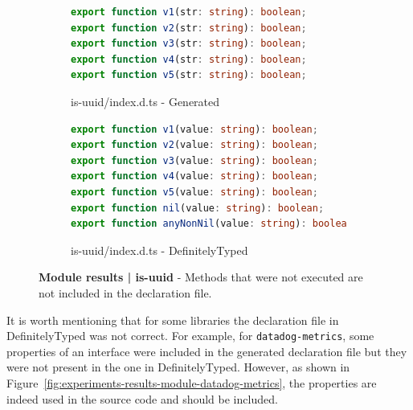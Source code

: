 \documentclass[a4paper,english,cleveref, autoref]{lipics-v2019}
\newcommand{\figref}[1]{Figure~\ref{#1}}
\begin{document}
\begin{figure}[tp]
    \centering
    \begin{subfigure}{0.48\linewidth}
      \begin{lstlisting}[language=TypeScript]
export function v1(str: string): boolean;
export function v2(str: string): boolean;
export function v3(str: string): boolean;
export function v4(str: string): boolean;
export function v5(str: string): boolean;
      \end{lstlisting}
      \caption{is-uuid/index.d.ts - Generated}
    \end{subfigure}
    \hfill
    \begin{subfigure}{0.48\linewidth}
      \begin{lstlisting}[language=TypeScript]
export function v1(value: string): boolean;
export function v2(value: string): boolean;
export function v3(value: string): boolean;
export function v4(value: string): boolean;
export function v5(value: string): boolean;
export function nil(value: string): boolean;
export function anyNonNil(value: string): boolean;
      \end{lstlisting}
      \caption{is-uuid/index.d.ts - DefinitelyTyped}
    \end{subfigure}

    \caption{\textbf{Module results | is-uuid} - Methods that were not executed are not included in the declaration file.}
    \label{fig:experiments-results-module-is-uuid}
\end{figure}

It is worth mentioning that for some libraries the declaration file in DefinitelyTyped was not correct. For example, for \lstinline{datadog-metrics}, some properties of an interface were included in the generated declaration file but they were not present in the one in DefinitelyTyped. However, as shown in \figref{fig:experiments-results-module-datadog-metrics}, the properties are indeed used in the source code and should be included.
\end{document}
